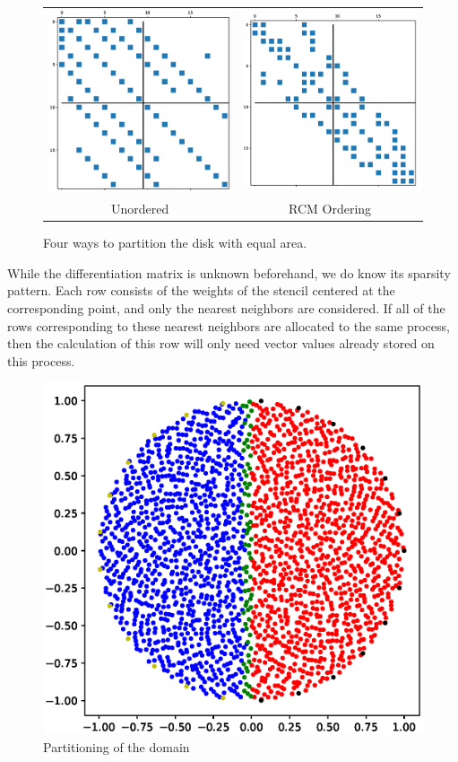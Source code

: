 \documentclass[12pt]{article}
\begin{document}
	\begin{figure}[ht]
		\centering
		\begin{tabular}{cc}
			\includegraphics[width=.4\textwidth]{no_order_spy.eps} & \includegraphics[width=.4\textwidth]{rcm_order_spy.eps} \\
			Unordered & RCM Ordering \\
		\end{tabular}
		\caption{Four ways to partition the disk with equal area.}
		\label{matrix_spy}
	\end{figure}
	
	While the differentiation matrix is unknown beforehand, we do know its sparsity pattern. Each row consists of the weights of the stencil centered at the corresponding point, and only the nearest neighbors are considered. If all of the rows corresponding to these nearest neighbors are allocated to the same process, then the calculation of this row will only need vector values already stored on this process. 
	
	\begin{figure}[ht]
		\centering
		\includegraphics[width=.75\textwidth]{nearest_2proc_disk.eps}
		\caption{Partitioning of the domain }
		\label{nearest_2proc_disk}
	\end{figure}
	
\end{document}
